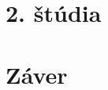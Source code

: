 \documentclass[10pt,oneside,slovak,a4paper]{article}
\begin{document}
\section{2. štúdia} \label{dolezitejsia}




\section{Záver} \label{zaver} %






\end{document}
